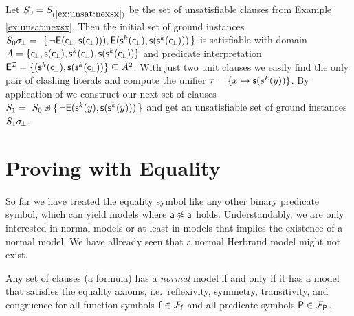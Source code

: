 \begin{example}\label{ex:unsat2}
Let $S_0 = S_{(\ref{ex:unsat:nexsx})}$ be the set of unsatisfiable clauses from Example \ref{ex:unsat:nexsx}. 
Then the initial set of ground instances 
$S_0\sigma\!_\bot =\
\{\,
{ \lnot{\mathsf{E}}({\mathsf c}\!_\bot, {\mathsf s}({\mathsf c}\!_\bot)))}, 
{ {\mathsf{E}}({\mathsf s}^k({\mathsf c}\!_\bot), {\mathsf s}({\mathsf s}^k({\mathsf c}\!_\bot)))}
\,\}$
is satisfiable with domain $A = \{ {\mathsf c}\!_\bot, {\mathsf s}({\mathsf c}\!_\bot), {\mathsf s}^k({\mathsf c}\!_\bot), {\mathsf s}({\mathsf s}^k({\mathsf c}\!_\bot)) \}$
and predicate interpretation 
${\mathsf{E}}^{\mathcal I} = \{ ({\mathsf s}^k({\mathsf c}\!_\bot), {\mathsf s}({\mathsf s}^k({\mathsf c}\!_\bot))
 \} \subseteq A^2$. 
% 
 With just two unit clauses we easily find the only pair of clashing literals and compute the unifier
 $\tau = \{ x\mapsto {\mathsf s}(s^k(y)) \}$. 
 By application of \InstGen we construct our next set of clauses
$
S_1 =\
S_0 \uplus
 \{\,
 { \lnot{\mathsf{E}}({\mathsf s}^k(y), {\mathsf s}({\mathsf s}^k(y)))}
 \,\}
 $ 
 and get an unsatisfiable set of ground instances $S_1\sigma\!_\bot$.
\end{example}




\section{Proving with Equality}

So far we have treated the equality symbol like any other binary predicate symbol, 
which can yield models where ${\mathsf a}\not\approx{\mathsf a}$ holds. 
Understandably, we are only interested in normal models or 
at least in models that implies the existence of a normal model.
We have allready seen that a normal Herbrand model might not exist.

\begin{theorem}\cite{Harrison:2009:HPL:1540610}
	Any set of clauses (a formula) has a \emph{normal} model 
	if and only if it has a model that satisfies the 
	{\myem equality axioms}, i.e.~reflexivity, symmetry, transitivity, 
	and congruence for all function symbols ${\mathsf f}\in{{\mathcal F}_{\mathsf f}}$
	and all predicate symbols ${\mathsf P}\in{{\mathcal F}_{\mathsf P}}$.
\end{theorem}


